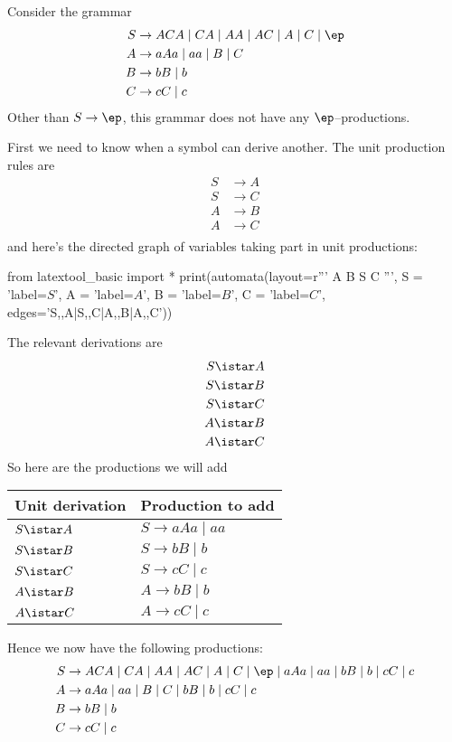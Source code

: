 \newpage
\begin{eg}
Consider the grammar
\begin{align*}
S &\rightarrow ACA \mid CA \mid AA \mid AC \mid A \mid C \mid \ep \\
A &\rightarrow aAa \mid aa \mid B \mid C \\
B &\rightarrow bB \mid b \\
C &\rightarrow cC \mid c
\end{align*}
Other than $S \rightarrow \ep$, this grammar does not have any 
$\ep$--productions.
\end{eg}

First we need to know when a symbol can derive another.
The unit production rules are
\begin{align*}
S &\rightarrow A \\
S &\rightarrow C \\
A &\rightarrow B \\
A &\rightarrow C \\
\end{align*}
and here's the directed graph of variables taking part in unit productions: 
\begin{python}
from latextool_basic import *
print(automata(layout=r'''
   A  B
S  
   C
''',
S = 'label=$S$',
A = 'label=$A$',
B = 'label=$B$',
C = 'label=$C$',
edges='S,,A|S,,C|A,,B|A,,C'))
\end{python}
The relevant derivations are
\begin{align*}
S \istar A \\
S \istar B \\
S \istar C \\
A \istar B \\
A \istar C
\end{align*}
So here are the productions we will add
\begin{center}
\begin{tabular}{|l|l|} \hline
Unit derivation & Production to add \\ \hline
$S \istar A$    & $S \rightarrow aAa \mid aa$ \\ \hline
$S \istar B$    & $S \rightarrow bB \mid b$ \\ \hline
$S \istar C$    & $S \rightarrow cC \mid c$ \\ \hline
$A \istar B$    & $A \rightarrow bB \mid b$ \\ \hline
$A \istar C$    & $A \rightarrow cC \mid c$ \\ \hline
\end{tabular}
\end{center}
Hence we now have the following productions:
\begin{align*}
S &\rightarrow ACA \mid CA \mid AA \mid AC \mid A \mid C \mid \ep \mid aAa \mid aa \mid
  bB \mid b \mid cC \mid c \\
A &\rightarrow aAa \mid aa \mid B \mid C \mid bB \mid b \mid cC \mid c \\
B &\rightarrow bB \mid b \\
C &\rightarrow cC \mid c  
\end{align*}


